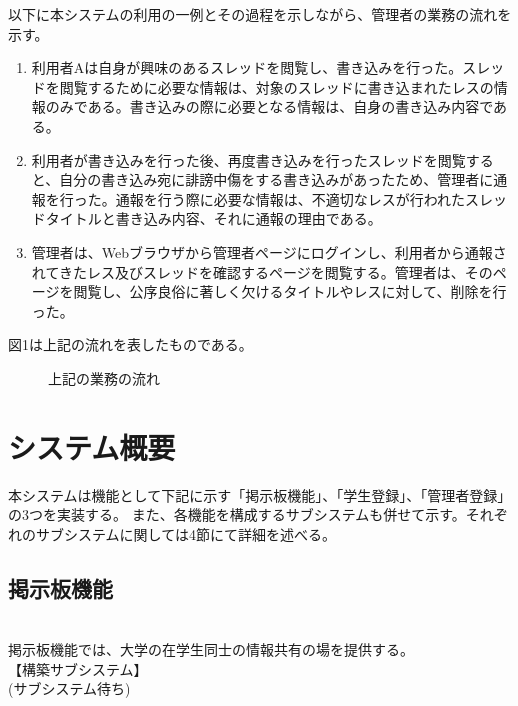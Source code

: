 \documentclass[a4j]{jarticle}
\begin{document}
以下に本システムの利用の一例とその過程を示しながら、管理者の業務の流れを示す。

\begin{enumerate}
  \item 利用者Aは自身が興味のあるスレッドを閲覧し、書き込みを行った。スレッドを閲覧するために必要な情報は、対象のスレッドに書き込まれたレスの情報のみである。書き込みの際に必要となる情報は、自身の書き込み内容である。

  \item  利用者が書き込みを行った後、再度書き込みを行ったスレッドを閲覧すると、自分の書き込み宛に誹謗中傷をする書き込みがあったため、管理者に通報を行った。通報を行う際に必要な情報は、不適切なレスが行われたスレッドタイトルと書き込み内容、それに通報の理由である。
  \item  管理者は、Webブラウザから管理者ページにログインし、利用者から通報されてきたレス及びスレッドを確認するページを閲覧する。管理者は、そのページを閲覧し、公序良俗に著しく欠けるタイトルやレスに対して、削除を行った。
\end{enumerate}

図1は上記の流れを表したものである。


\begin{figure}[h!]
\begin{center}
\caption{上記の業務の流れ}
\label{fig:figuretest}
\end{center}
\end{figure}














\section{システム概要}
本システムは機能として下記に示す「掲示板機能」、「学生登録」、「管理者登録」の3つを実装する。
 また、各機能を構成するサブシステムも併せて示す。それぞれのサブシステムに関しては4節にて詳細を述べる。

\subsection{掲示板機能}
\\掲示板機能では、大学の在学生同士の情報共有の場を提供する。
\\【構築サブシステム】
\\ (サブシステム待ち)
\end{document}
